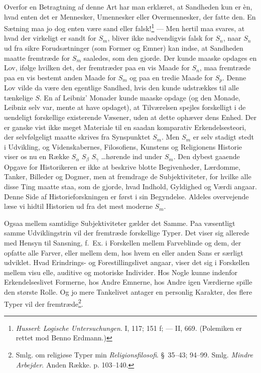 \documentclass[12pt,a4paper]{book}
\newcommand{\opage}[1]{\marginnote{\footnotesize\textit{[#1]}}}
\newcommand{\apage}[1]{\marginnote{\footnotesize\textit{[#1]}}}
\begin{document}
\apage{304} Overfor en Betragtning af denne Art har man erklæret, at Sandheden kun er èn, hvad enten det er Mennesker, Umennesker eller Overmennesker, der fatte den. En Sætning maa
jo dog enten være sand eller falsk!\footnote{\emph{Husserl}: \emph{Logische
Untersuchungen}. I, 117; 151 f; --- II, 669. (Polemiken er rettet mod Benno
Erdmann.)} --- Men hertil maa svares, at hvad der virkeligt er sandt for $S_m$, bliver
ikke nødvendigvis falsk for $S_n$, naar $S_n$ ud fra sikre Forudsætninger (som Former
og Emner) kan indse, at Sandheden maatte fremtræde for $S_m$ saaledes, som den gjorde.
Der kunde maaske opdages en Lov, ifølge hvilken det, der fremtræder paa en vis Maade
for $S_n$, maa fremtræde paa en vis bestemt anden Maade for $S_m$ og paa en tredie
Maade for $S_p$. Denne Lov vilde da være den egentlige Sandhed, hvis den kunde
udstrækkes til alle tænkelige $S$. En af Leibniz' Monader kunde maaske opdage (og den
Monade, Leibniz selv var, mente at have opdaget), at Tilværelsen spejles forskelligt i
de uendeligt forskellige existerende Væsener, uden at dette ophæver dens Enhed. Der er
ganske vist ikke meget Materiale til en saadan komparativ Erkendelsesteori, der
selvfølgeligt maatte skrives fra Synspunktet $S_m$. Men $S_m$ er selv stadigt stedt i
Udvikling, og Videnskabernes, Filosofiens, Kunstens og Religionens Historie viser os
nu en Række $S_\alpha$ $S_\beta$ $S_\gamma$ \ldots hørende ind under $S_m$. Den dybest
gaaende Opgave for Historikeren er ikke at beskrive blotte Begivenheder, Lærdomme,
Tanker, Billeder og Dogmer, men at fremdrage de Subjektiviteter, for hvilke alle disse
Ting maatte staa, som de gjorde, hvad Indhold, Gyldighed og Værdi angaar. Denne Side
af Historieforskningen er først i sin Begyndelse. Aldeles overvejende læse vi hidtil
Historien ud fra det mest moderne $S_m$.

Ogsaa mellem samtidige Subjektiviteter gælder det Samme. Paa væsentligt samme Udviklingstrin vil der fremtræde forskellige Typer. Det viser sig allerede med Hensyn
til Sansning, f.\ Ex. i Forskellen mellem Farveblinde og dem, der opfatte alle Farver,
eller mellem dem, hos hvem en eller anden Sans er særligt udviklet. Hvad Erindrings-
og Forestillingslivet angaar, viser det sig i Forskellen mellem visu%
\opage{305}elle, auditive og
motoriske Individer. Hos Nogle kunne indenfor Erkendelseslivet Formerne, hos Andre
Emnerne, hos Andre igen Værdierne spille den største Rolle. Og jo mere Tankelivet
antager en personlig Karakter, des flere Typer vil der fremtræde\footnote{Smlg. om
religiøse Typer min \emph{Religionsfilosofi}. \S\ 35--43; 94--99. Smlg. \emph{Mindre
Arbejder}. Anden Række. p. 103--140.}.
\end{document}
